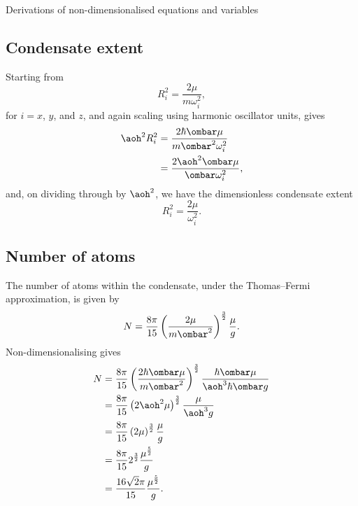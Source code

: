 \begin{chapter}{\label{cha:nondim}Derivations of non-dimensionalised equations
and variables}
  \subsection{Condensate extent}
  Starting from
  \begin{equation*}
    R_{i}^{2} = \frac{2\mu}{m \omega_{i}^{2}},
  \end{equation*}
  for $i=x$, $y$, and $z$, and again scaling using harmonic oscillator units,
  gives
  \begin{equation*}
    \begin{aligned}
      \aoh^{2} R_{i}^{2} &= \frac{2 \hbar \ombar \mu}{m \ombar^{2}
      \omega_{i}^{2}} \\
      &= \frac{2\aoh^{2} \ombar \mu}{\ombar \omega_{i}^{2}},
    \end{aligned}
  \end{equation*}
  and, on dividing through by $\aoh^{2}$, we have the dimensionless condensate
  extent
  \begin{equation*}
    R_{i}^{2} = \frac{2\mu}{\omega_{i}^{2}}.
  \end{equation*}

  \subsection{Number of atoms}
  The number of atoms within the condensate, under the Thomas--Fermi
  approximation, is given by
  \begin{equation*}
    N = \frac{8\pi}{15} \left( \frac{2\mu}{m\ombar^2} \right)^{\frac{3}{2}}
    \frac{\mu}{g}.
  \end{equation*}
  Non-dimensionalising gives
  \begin{equation*}
    \begin{aligned}
      N &= \frac{8\pi}{15} \left( \frac{2\hbar \ombar \mu}{m\ombar^2}
      \right)^{\frac{3}{2}} \frac{\hbar \ombar \mu}{\aoh^{3} \hbar \ombar g} \\
      &= \frac{8\pi}{15} \left( 2\aoh^{2} \mu \right)^{\frac{3}{2}}
      \frac{\mu}{\aoh^{3} g} \\
      &= \frac{8\pi}{15} \left( 2\mu \right)^{\frac{3}{2}} \frac{\mu}{g} \\
      &= \frac{8\pi}{15} 2^{\frac{3}{2}} \frac{\mu^{\frac{5}{2}}}{g} \\
      &= \frac{16\sqrt{2}\pi}{15} \frac{\mu^{\frac{5}{2}}}{g}.
  \end{aligned}
  \end{equation*}


\end{chapter}
